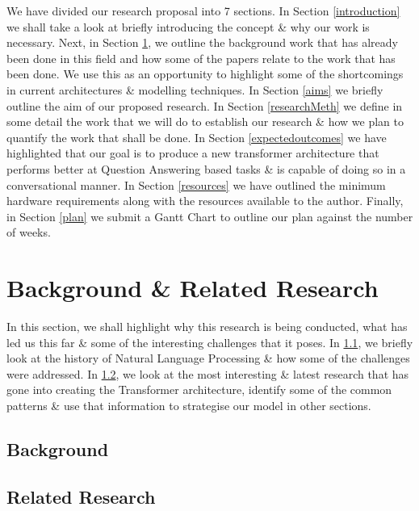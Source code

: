 \documentclass[11pt]{article}
\begin{document}
We have divided our research proposal into 7 sections.
In Section \ref{introduction} we shall take a look at briefly introducing the concept \& why our work is necessary. Next, in Section \ref{backRR}, we outline the background work that has already been done in this field and how some of the papers relate to the work that has been done. We use this as an opportunity to highlight some of the shortcomings in current architectures \& modelling techniques. In Section \ref{aims} we briefly outline the aim of our proposed research. In Section \ref{researchMeth} we define in some detail the work that we will do to establish our research \& how we plan to quantify the work that shall be done. In Section \ref{expectedoutcomes} we have highlighted that our goal is to produce a new transformer architecture that performs better at Question Answering based tasks \& is capable of doing so in a conversational manner.
In Section \ref{resources} we have outlined the minimum hardware requirements along with the resources available to the author. Finally, in Section \ref{plan} we submit a Gantt Chart to outline our plan against the number of weeks.

\section{Background \& Related Research}\label{backRR}
In this section, we shall highlight why this research is being conducted, what has led us this far \& some of the interesting challenges that it poses. In \ref{back}, we briefly look at the history of Natural Language Processing \& how some of the challenges were addressed. In \ref{rr}, we look at the most interesting \& latest research that has gone into creating the Transformer architecture, identify some of the common patterns \& use that information to strategise our model in other sections.
\subsection{Background}\label{back}

\subsection{Related Research}\label{rr}
\end{document}
